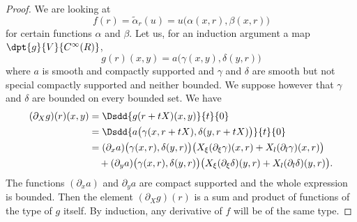 \begin{proof}
We are looking at 
\[ 
 f(r)=\tilde\alpha_r(u)=u\big( \alpha(x,r),\beta(x,r) \big)
\]
for certain functions $\alpha$ and $\beta$. Let us, for an induction argument a map $\dpt{ g }{ V }{  C^{\infty}(R) }$,
\begin{equation} \label{eq_formfind}
  g(r)(x,y)=a\big( \gamma(x,y),\delta(y,r) \big)
\end{equation}
where $a$ is smooth and compactly supported and $\gamma$ and $\delta$ are smooth but not special compactly supported and neither bounded. We suppose however that $\gamma$ and $\delta$ are bounded on every bounded set. We have
\begin{equation}
\begin{split}
  (\partial_Xg)(r)(x,y)&=\Dsdd{ g(r+tX)(x,y) }{t}{0}\\
		&=\Dsdd{ a\big( \gamma(x,r+tX),\delta(y,r+tX) \big) }{t}{0}\\
		&=(\partial_xa)\big( \gamma(x,r),\delta(y,r) \big)
           \big( X_{\xi}(\partial_{\xi}\gamma)(x,r)+X_l(\partial_l\gamma)(x,r)   \big)\\
		&\quad+(\partial_ya)\big( \gamma(x,r),\delta(y,r) \big)\big( X_{\xi}(\partial_{\xi}\delta)(y,r)+X_l(\partial_l\delta)(y,r) \big).
\end{split}
\end{equation}
The functions $(\partial_x a)$ and $\partial_ya$ are compact supported and the whole expression is bounded. Then the element $(\partial_Xg)(r)$ is a sum and product of functions of the type of $g$ itself. By induction, any derivative of $f$ will be of the same type.


\end{proof}
